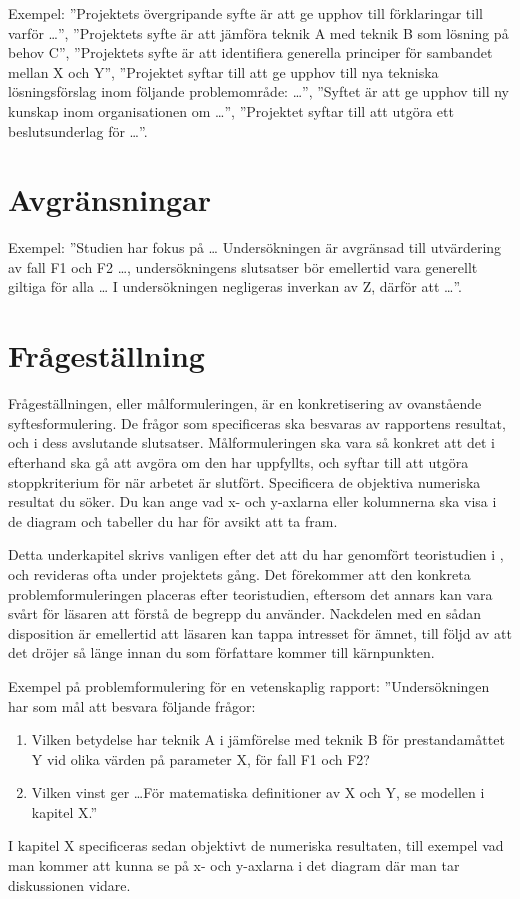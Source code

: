 Exempel:
''Projektets övergripande syfte är att ge upphov till förklaringar till varför 
\dots'',
''Projektets syfte är att jämföra teknik A med teknik B som lösning på behov 
C'',
''Projektets syfte är att identifiera generella principer för sambandet mellan 
X och Y'',
''Projektet syftar till att ge upphov till nya tekniska lösningsförslag inom 
följande problemområde: \dots'',
''Syftet är att ge upphov till ny kunskap inom organisationen om \dots'',
''Projektet syftar till att utgöra ett beslutsunderlag för \dots''.


\section{Avgränsningar}
\label{sec:delimit}
\noindent
Exempel:
''Studien har fokus på \dots
Undersökningen är avgränsad till utvärdering av fall F1 och F2 \dots, 
undersökningens slutsatser bör emellertid vara generellt giltiga för alla \dots
I undersökningen negligeras inverkan av Z, därför att \dots''.


\section{Frågeställning}
\label{sec:problemstatement}
\noindent
Frågeställningen, eller målformuleringen, är en konkretisering av ovanstående 
syftesformulering.
De frågor som specificeras ska besvaras av rapportens resultat, och i dess 
avslutande slutsatser.
Målformuleringen ska vara så konkret att det i efterhand ska gå att avgöra om 
den har uppfyllts, och syftar till att utgöra stoppkriterium för när arbetet är 
slutfört.
Specificera de objektiva numeriska resultat du söker.
Du kan ange vad x- och y-axlarna eller kolumnerna ska visa i de diagram och 
tabeller du har för avsikt att ta fram.

Detta underkapitel skrivs vanligen efter det att du har genomfört teoristudien 
i , och revideras ofta under projektets gång.
Det förekommer att den konkreta problemformuleringen placeras efter 
teoristudien, eftersom det annars kan vara svårt för läsaren att förstå de 
begrepp du använder.
Nackdelen med en sådan disposition är emellertid att läsaren kan tappa 
intresset för ämnet, till följd av att det dröjer så länge innan du som 
författare kommer till kärnpunkten.

Exempel på problemformulering för en vetenskaplig rapport:
''Undersökningen har som mål att besvara följande frågor:
\begin{enumerate}
	\item Vilken betydelse har teknik A i jämförelse med teknik B för 
		prestandamåttet Y vid olika värden på parameter X, för fall F1 och F2?
	\item Vilken vinst ger \dots För matematiska definitioner av X och Y, se 
		modellen i kapitel X.''
\end{enumerate}
I kapitel X specificeras sedan objektivt de numeriska resultaten, till exempel 
vad man kommer att kunna se på x- och y-axlarna i det diagram där man tar 
diskussionen vidare.


